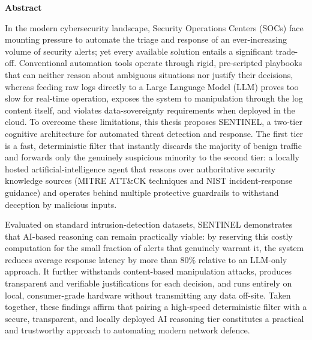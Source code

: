 \documentclass[12pt,a4paper]{report}
\begin{document}
\pagestyle{fancy}
\setcounter{page}{1} %

\newpage
{}
\begin{center}
    {\Large\textbf{Abstract}}
\end{center}
\vspace{0.5cm}

\begin{singlespace}
In the modern cybersecurity landscape, Security Operations Centers (SOCs) face mounting pressure to automate the triage and response of an ever-increasing volume of security alerts; yet every available solution entails a significant trade-off. Conventional automation tools operate through rigid, pre-scripted playbooks that can neither reason about ambiguous situations nor justify their decisions, whereas feeding raw logs directly to a Large Language Model (LLM) proves too slow for real-time operation, exposes the system to manipulation through the log content itself, and violates data-sovereignty requirements when deployed in the cloud. To overcome these limitations, this thesis proposes SENTINEL, a two-tier cognitive architecture for automated threat detection and response. The first tier is a fast, deterministic filter that instantly discards the majority of benign traffic and forwards only the genuinely suspicious minority to the second tier: a locally hosted artificial-intelligence agent that reasons over authoritative security knowledge sources (MITRE ATT\&CK techniques and NIST incident-response guidance) and operates behind multiple protective guardrails to withstand deception by malicious inputs.

Evaluated on standard intrusion-detection datasets, SENTINEL demonstrates that AI-based reasoning can remain practically viable: by reserving this costly computation for the small fraction of alerts that genuinely warrant it, the system reduces average response latency by more than $80\%$ relative to an LLM-only approach. It further withstands content-based manipulation attacks, produces transparent and verifiable justifications for each decision, and runs entirely on local, consumer-grade hardware without transmitting any data off-site. Taken together, these findings affirm that pairing a high-speed deterministic filter with a secure, transparent, and locally deployed AI reasoning tier constitutes a practical and trustworthy approach to automating modern network defence.


\end{singlespace}
\end{document}
